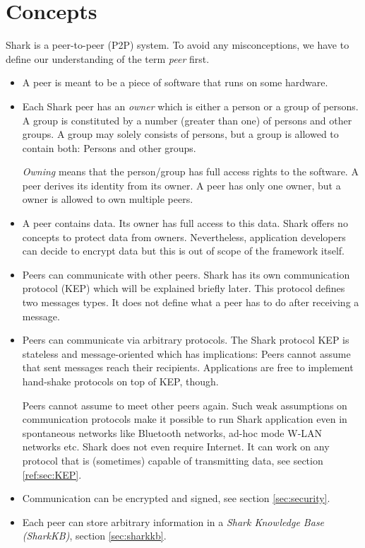 \chapter{Concepts}
Shark is a peer-to-peer (P2P) system. To avoid any misconceptions, we have to define our understanding of the term {\it peer} first.

\begin{itemize}
\item 
A peer is meant to be a piece of software that runs on some hardware.

\item
Each Shark peer has an {\it owner} which is either a person or a group of persons. A group is constituted by a number (greater than one) of persons and other groups. A group may solely consists of persons, but a group is allowed to contain both: Persons and other groups.

{\it Owning} means that the person/group has full access rights to the software. 
A peer derives its identity from its owner. A peer has only one owner, but a owner is allowed to own multiple peers. 

\item
A peer contains data. Its owner has full access to this data. Shark offers no concepts to protect data from owners. Nevertheless, application developers can decide to encrypt data but this is out of scope of the framework itself.

\item
Peers can communicate with other peers. Shark has its own communication protocol (KEP) which will be explained briefly later. This protocol defines two messages types. It does not define what a peer has to do after receiving a message.

\item
Peers can communicate via arbitrary protocols. The Shark protocol KEP is stateless and message-oriented which has implications: Peers cannot assume that sent messages reach their recipients. Applications are free to implement hand-shake protocols on top of KEP, though.

Peers cannot assume to meet other peers again. Such weak assumptions on communication protocols make it possible to run Shark application even in spontaneous networks like Bluetooth networks, ad-hoc mode W-LAN networks etc. Shark does not even require Internet. It can work on any protocol that is (sometimes) capable of transmitting data, see section \ref{ref:sec:KEP}.

\item
Communication can be encrypted and signed, see section \ref{sec:security}.

\item
Each peer can store arbitrary information in a {\it Shark Knowledge Base (SharkKB)}, section \ref{sec:sharkkb}.


\end{itemize}

